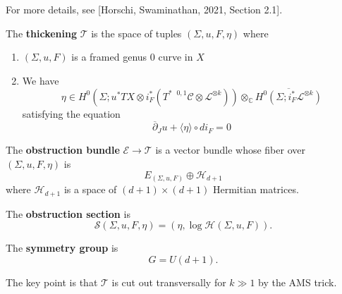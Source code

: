 For more details, see [Horschi, Swaminathan, 2021, Section 2.1].

\begin{proposition}

The \textbf{thickening} $\mathcal{T}$ is the space of tuples $(\Sigma, u, F, \eta)$ where
\begin{enumerate}
\item $(\Sigma, u, F)$ is a framed genus $0$ curve in $X$
\item We have
    \[
    \eta \in H^0(\Sigma; u^*TX\otimes i_F^*(T^{* \text{ }0,1}\mathcal{C}\otimes \mathcal{L}^{\otimes k}))\otimes_{\mathbb{C}} \overline{H^0(\Sigma; i_F^* \mathcal{L}^{\otimes k})}
    \]
    satisfying the equation
    \[
    \overline{\partial}_J u + \langle \eta \rangle \circ di_F=0
    \]
\end{enumerate}

\end{proposition}

\begin{proposition}

The \textbf{obstruction bundle} $\mathcal{E}\to \mathcal{T}$ is a vector bundle whose fiber over $(\Sigma, u, F, \eta)$ is
\[
E_{(\Sigma, u, F)}\oplus \mathcal{H}_{d+1}
\]
where $\mathcal{H}_{d+1}$ is a space of $(d+1)\times (d+1)$ Hermitian matrices.

\end{proposition}

\begin{proposition}

The \textbf{obstruction section} is
\[
\mathcal{S}(\Sigma, u, F, \eta)=(\eta, \log \mathcal{H}(\Sigma, u, F)).
\]

\end{proposition}

\begin{proposition}

The \textbf{symmetry group} is
\[
G=U(d+1).
\]

\end{proposition}

The key point is that $\mathcal{T}$ is cut out transversally for $k\gg 1$ by the AMS trick.